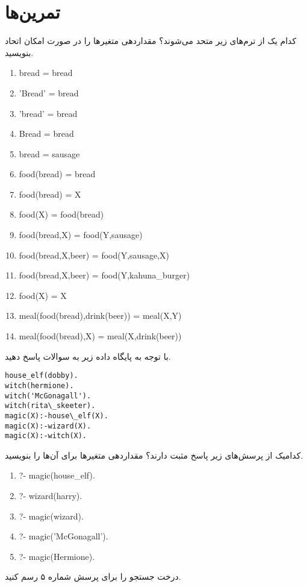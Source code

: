 \section{تمرین‌ها}
\begin{exercise}
کدام یک از ترم‌های زیر متحد می‌شوند؟ مقداردهی متغیرها را در صورت امکان اتحاد بنویسید.\\
\begin{latin}
\begin{enumerate}
\item bread = bread
\item 'Bread' = bread
\item 'bread' = bread
\item Bread = bread
\item bread = sausage
\item food(bread) = bread
\item food(bread) = X
\item food(X) = food(bread)
\item food(bread,X) = food(Y,sausage)
\item food(bread,X,beer) = food(Y,sausage,X)
\item food(bread,X,beer) = food(Y,kahuna\_burger)
\item food(X) = X
\item meal(food(bread),drink(beer)) = meal(X,Y)
\item meal(food(bread),X) = meal(X,drink(beer))
\end{enumerate}
\end{latin}
\end{exercise}

\begin{exercise}
با توجه به پایگاه داده زیر به سوالات پاسخ دهید.\\
\begin{latin}
\begin{lstlisting}
house_elf(dobby).
witch(hermione).
witch('McGonagall').
witch(rita\_skeeter).
magic(X):-house\_elf(X).
magic(X):-wizard(X).
magic(X):-witch(X).
\end{lstlisting}
\end{latin}
کدامیک از پرسش‌های زیر پاسخ مثبت دارند؟ مقداردهی متغیرها برای آن‌ها را بنویسید.\\
\begin{latin}
\begin{enumerate}
\item ?- magic(house\_elf).
\item ?- wizard(harry).
\item ?- magic(wizard).
\item ?- magic('McGonagall').
\item ?- magic(Hermione).
\end{enumerate}
\end{latin}

درخت جستجو را برای پرسش شماره ۵ رسم کنید.
\end{exercise}

